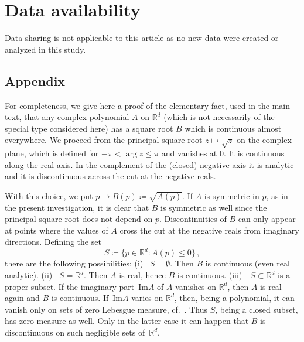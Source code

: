 \documentclass[11pt]{article}
\def\RR{\mathbb{R}}
\def\be{\begin{equation}}
\def\ee{\end{equation}}
\begin{document}
\section*{Data availability}
Data sharing is not applicable to this article as no new data were
created or analyzed in this study.

\begin{appendix}
\section*{Appendix}
For completeness, we give here a proof of the elementary fact, used
in the main text, that any complex polynomial $A$ on $\RR^d$
(which is not necessarily of the special type considered here)
has a square root $B$ which is
continuous almost everywhere.  We proceed from
the principal square root $z \mapsto \sqrt{z}$ on the complex
plane, which is defined for $- \pi < \arg z \leq \pi$ and vanishes
at $0$. It is continuous along the real axis. In the
complement of the (closed) negative axis it is analytic
and it is discontinuous across the cut at the negative reals. 

\medskip 
With this
choice, we put $p \mapsto B(p) \coloneqq \sqrt{A(p)}$. If $A$
is symmetric in $p$, as in the present investigation,
it is clear that $B$ is symmetric as well since 
the principal square root does not depend on $p$. Discontinuities 
of $B$ can only appear at points where the values of $A$ cross the
cut at the negative reals from imaginary directions. Defining the
set
\be
S \coloneqq \{ p \in \RR^d : A(p) \leq 0 \} \, ,
\ee
there are the following possibilities: (i) \ $S = \emptyset$. Then
$B$ is continuous (even real analytic). (ii) \ $S = \RR^d$. Then
$A$ is real, hence $B$ is continuous.
\mbox{(iii) \ $S \subset \RR^d$} is a proper subset. If the
imaginary part $\, \text{Im} A$ of $A$ vanishes on $\RR^d$, then $A$
is real again and $B$ is continuous. If $\, \text{Im} A$ varies on
$\RR^d$, then, being a polynomial, it can vanish only on sets of
zero Lebesgue measure, cf.~\cite{Ca}. Thus $S$, being a closed
subset, has zero measure as well. Only in the latter case it
can happen that $B$ is discontinuous on
such negligible sets of~$\RR^d$. 

\end{appendix}
\end{document}
